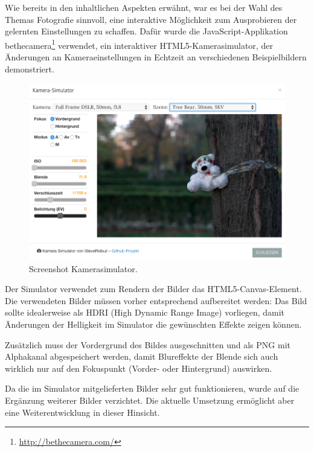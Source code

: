 \documentclass{article}
\begin{document}
Wie bereits in den inhaltlichen Aspekten erw\"ahnt, war es bei der Wahl des Themas Fotografie sinnvoll, eine interaktive M\"oglichkeit zum Ausprobieren der gelernten Einstellungen zu schaffen. Daf\"ur wurde die JavaScript-Applikation bethecamera\footnote{\url{http://bethecamera.com/}} verwendet, ein interaktiver HTML5-Kamerasimulator, der \"Anderungen an Kameraeinstellungen in Echtzeit an verschiedenen Beispielbildern demonstriert.

\begin{figure}[htb]
\begin{minipage}[b]{1.0\linewidth}
  \centering
\centerline{\includegraphics[width=\linewidth]{kamerasimulator.png}}
\end{minipage}
\caption{Screenshot Kamerasimulator.}
\label{fig:res}
\end{figure}

Der Simulator verwendet zum Rendern der Bilder das HTML5-Canvas-Element. Die verwendeten Bilder m\"ussen vorher entsprechend aufbereitet werden: Das Bild sollte idealerweise als HDRI (High Dynamic Range Image) vorliegen, damit \"Anderungen der Helligkeit im Simulator die gew\"unschten Effekte zeigen k\"onnen.

Zus\"atzlich muss der Vordergrund des Bildes ausgeschnitten und als PNG mit Alphakanal abgespeichert werden, damit Blureffekte der Blende sich auch wirklich nur auf den Fokuspunkt (Vorder- oder Hintergrund) auswirken.

Da die im Simulator mitgelieferten Bilder sehr gut funktionieren, wurde auf die Erg\"anzung weiterer Bilder verzichtet. Die aktuelle Umsetzung erm\"oglicht aber eine Weiterentwicklung in dieser Hinsicht.
\end{document}
